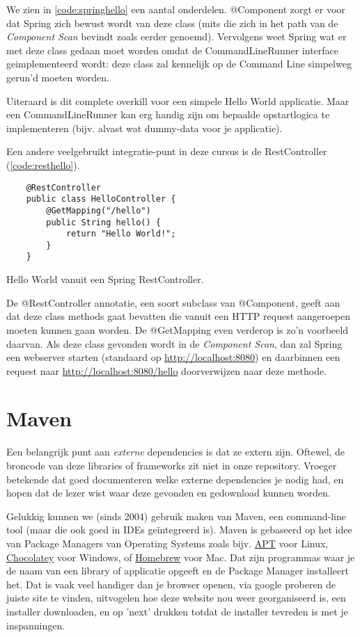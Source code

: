 We zien in \ref{code:springhello} een aantal onderdelen. @Component zorgt er voor dat Spring zich bewust wordt van
deze class (mits die zich in het path van de \emph{Component Scan} bevindt zoals eerder genoemd).
Vervolgens weet Spring wat er met deze class gedaan moet worden omdat de CommandLineRunner interface geimplementeerd wordt:
deze class zal kennelijk op de Command Line simpelweg gerun'd moeten worden.

Uiteraard is dit complete overkill voor een simpele Hello World applicatie. Maar een CommandLineRunner kan erg
handig zijn om bepaalde opstartlogica te implementeren (bijv. alvast wat dummy-data voor je applicatie).

Een andere veelgebruikt integratie-punt in deze cursus is de RestController (\ref{code:resthello}).

\begin{listing}[H]
    \begin{verbatim}
    @RestController
    public class HelloController {
        @GetMapping("/hello")
        public String hello() {
            return "Hello World!";
        }
    }
    \end{verbatim}
    \caption{Hello World vanuit een Spring RestController.}
    \label{code:resthello}
\end{listing}

De @RestController annotatie, een soort subclass van @Component, geeft aan dat deze class methods gaat bevatten
die vanuit een HTTP request aangeroepen moeten kunnen gaan worden. De @GetMapping even verderop is zo'n voorbeeld daarvan.
Als deze class gevonden wordt in de \emph{Component Scan}, dan zal Spring een webserver starten (standaard op
\href{http://localhost:8080}{http://localhost:8080}) en daarbinnen een request naar \href{http://localhost:8080/hello}{http://localhost:8080/hello} doorverwijzen naar deze
methode.

\section{Maven}

Een belangrijk punt aan \emph{externe} dependencies is dat ze extern zijn. Oftewel, de broncode van deze 
libraries of frameworks zit niet in onze repository. Vroeger betekende dat goed documenteren welke externe 
dependencies je nodig had, en hopen dat de lezer wist waar deze gevonden en gedownload kunnen worden.

Gelukkig kunnen we (sinds 2004) gebruik maken van Maven, een command-line tool (maar die ook goed in IDEs geïntegreerd is). 
Maven is gebaseerd op het idee van Package Managers van
Operating Systems zoals bijv. \href{https://en.wikipedia.org/wiki/APT_(software)}{APT} voor Linux, 
\href{https://chocolatey.org/}{Chocolatey} voor Windows, of \href{https://brew.sh/}{Homebrew} voor Mac. 
Dat zijn programmas waar je de naam van een library of applicatie opgeeft en de Package Manager installeert het.
Dat is vaak veel handiger dan je browser openen, via google proberen de juiste site te vinden, 
uitvogelen hoe deze website nou weer georganiseerd is, een installer downloaden, 
en op 'next' drukken totdat de installer tevreden is met je inspanningen.

